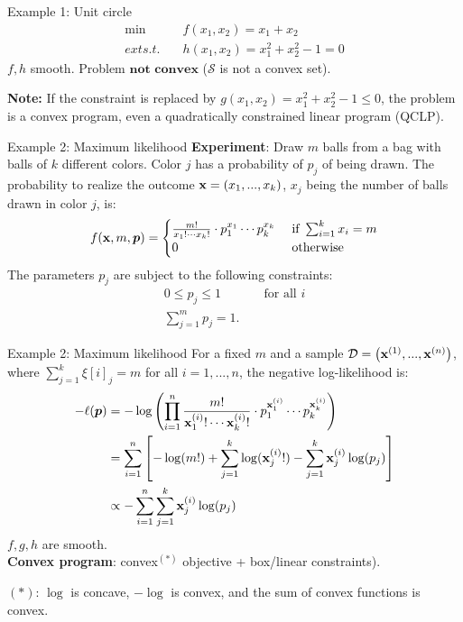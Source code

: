 \documentclass[11pt,compress,t,notes=noshow, xcolor=table]{beamer}
\begin{document}
\begin{frame2}{Example 1: Unit circle}
$$
\begin{aligned}
\min \quad & f(x_1, x_2) = x_1 + x_2 \\
ext{s.t. } \quad & h(x_1,x_2) = x_1^2 + x_2^2 - 1 = 0
\end{aligned}
$$
\vfill
{}
$f, h$ smooth. Problem $\textbf{not convex}$ ($\mathcal{S}$ is not a convex set).
\spacer
\begin{footnotesize}
\textbf{Note: } If the constraint is replaced by $g(x_1, x_2) = x_1^2 + x_2^2 - 1 \le 0$, the problem is a convex program, even a quadratically constrained linear program (QCLP).
\end{footnotesize}
\end{frame2}


\begin{frame2}{Example 2: Maximum likelihood}
\textbf{Experiment}: Draw $m$ balls from a bag with balls of $k$ different colors.
Color $j$ has a probability of $p_j$ of being drawn.
\spacer
The probability to realize the outcome $\xv = (x_1, ..., x_k)$, $x_j$ being the number of balls drawn in color $j$, is:
$$
f(\xv, m, \bm{p}) = \begin{cases} \frac{m!}{x_1! \cdots x_k!} \cdot p_1^{x_1} \cdots p_k^{x_k} & \text{ if } \sum_{i = 1}^k x_i = m \\ 0 & \text{ otherwise}\end{cases}
$$
The parameters $p_j$ are subject to the following constraints:
$$
\begin{aligned}
0 \le p_j \le 1 && \text{ for all } i \\
\sum_{j = 1}^m p_j = 1. &&
\end{aligned}
$$
\end{frame2}


\begin{frame2}{Example 2: Maximum likelihood}
For a fixed $m$ and a sample $\D = \left(\xi[1], ..., \xi[n]\right)$, where $\sum_{j = 1}^k \xi[i]_j = m$ for all $i = 1, ..., n$, the negative log-likelihood is:
$$
\begin{aligned}
- \ell(\bm{p}) &= - \log \left(\prod_{i = 1}^n  \frac{m!}{\xi_1! \cdots \xi_k!} \cdot p_1^{\xi_1} \cdots p_k^{\xi_k}    \right) \\
&= \sumin \left[- \log(m!) + \sum_{j = 1}^k \log(\xi_j!) - \sum_{j = 1}^k \xi_j \log(p_j)\right] \\
&\propto - \sumin \sum_{j = 1}^k \xi_j \log(p_j)
\end{aligned}
$$
$f, g, h$ are smooth.\\\textbf{Convex program}: convex$^{(*)}$ objective + box/linear constraints).
\vfill
\begin{footnotesize}
${(*)}$: $\log$ is concave, $- \log $ is convex, and the sum of convex functions is convex.
\end{footnotesize}
\end{frame2}
\end{document}
